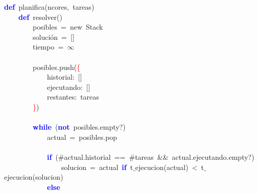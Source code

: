 \noindent
\mbox{}\textbf{\textcolor{Blue}{def}}\ planifica\textcolor{BrickRed}{(}ncores\textcolor{BrickRed}{,}\ tareas\textcolor{BrickRed}{)} \\
\mbox{}\ \ \ \ \textbf{\textcolor{Blue}{def}}\ resolver\textcolor{BrickRed}{()} \\
\mbox{}\ \ \ \ \ \ \ \ posibles\ \textcolor{BrickRed}{=}\ new\ Stack \\
\mbox{}\ \ \ \ \ \ \ \ solución\ \textcolor{BrickRed}{=}\ \textcolor{BrickRed}{[]} \\
\mbox{}\ \ \ \ \ \ \ \ tiempo\ \textcolor{BrickRed}{=}\ $\infty$ \\
\mbox{} \\
\mbox{}\ \ \ \ \ \ \ \ posibles\textcolor{BrickRed}{.}push\textcolor{BrickRed}{(}\textcolor{Red}{\{} \\
\mbox{}\ \ \ \ \ \ \ \ \ \ \ \ historial\textcolor{BrickRed}{:}\ \textcolor{BrickRed}{[]} \\
\mbox{}\ \ \ \ \ \ \ \ \ \ \ \ ejecutando\textcolor{BrickRed}{:}\ \textcolor{BrickRed}{[]} \\
\mbox{}\ \ \ \ \ \ \ \ \ \ \ \ restantes\textcolor{BrickRed}{:}\ tareas \\
\mbox{}\ \ \ \ \ \ \ \ \textcolor{Red}{\}}\textcolor{BrickRed}{)} \\
\mbox{} \\
\mbox{}\ \ \ \ \ \ \ \ \textbf{\textcolor{Blue}{while}}\ \textcolor{BrickRed}{(}\textbf{\textcolor{Blue}{not}}\ posibles\textcolor{BrickRed}{.}empty?\textcolor{BrickRed}{)} \\
\mbox{}\ \ \ \ \ \ \ \ \ \ \ \ actual\ \textcolor{BrickRed}{=}\ posibles\textcolor{BrickRed}{.}pop \\
\mbox{} \\
\mbox{}\ \ \ \ \ \ \ \ \ \ \ \ \textbf{\textcolor{Blue}{if}}\ \textcolor{BrickRed}{(}\#actual\textcolor{BrickRed}{.}historial\ \textcolor{BrickRed}{==}\ \#tareas\ \textcolor{BrickRed}{\&\&}\ actual\textcolor{BrickRed}{.}ejecutando\textcolor{BrickRed}{.}empty?\textcolor{BrickRed}{)} \\
\mbox{}\ \ \ \ \ \ \ \ \ \ \ \ \ \ \ \ solucion\ \textcolor{BrickRed}{=}\ actual\ \textbf{\textcolor{Blue}{if}}\ t$\_$ejecucion\textcolor{BrickRed}{(}actual\textcolor{BrickRed}{)}\ \textcolor{BrickRed}{\textless{}}\ t$\_$ejecucion\textcolor{BrickRed}{(}solucion\textcolor{BrickRed}{)} \\
\mbox{}\ \ \ \ \ \ \ \ \ \ \ \ \textbf{\textcolor{Blue}{else}} \\
